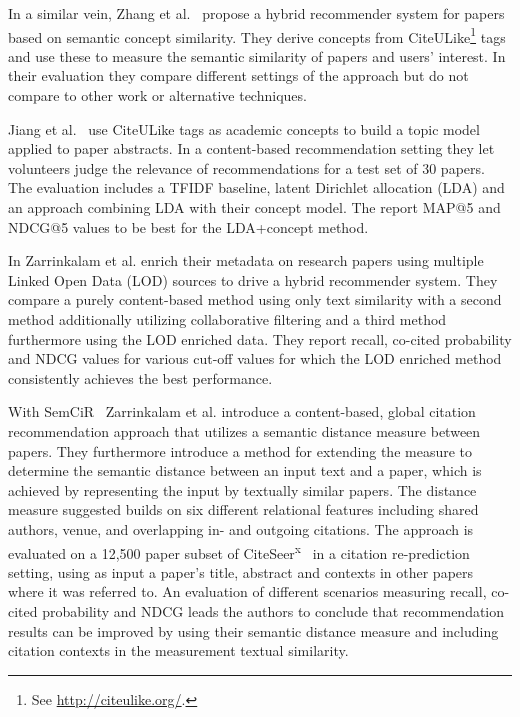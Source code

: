 In a similar vein, Zhang et al.~\cite{Zhang2008} propose a hybrid recommender system for papers based on semantic concept similarity. They derive concepts from CiteULike\footnote{See \url{http://citeulike.org/}.} tags and use these to measure the semantic similarity of papers and users' interest. In their evaluation they compare different settings of the approach but do not compare to other work or alternative techniques.

Jiang et al.~\cite{Jiang2012} use CiteULike tags as academic concepts to build a topic model applied to paper abstracts. In a content-based recommendation setting they let volunteers judge the relevance of recommendations for a test set of 30 papers. The evaluation includes a TFIDF baseline, latent Dirichlet allocation (LDA) and an approach combining LDA with their concept model. The report MAP@5 and NDCG@5 values to be best for the LDA+concept method.

In \cite{Zarrinkalam2012} Zarrinkalam et al. enrich their metadata on research papers using multiple Linked Open Data (LOD) sources to drive a hybrid recommender system. They compare a purely content-based method using only text similarity with a second method additionally utilizing collaborative filtering and a third method furthermore using the LOD enriched data. They report recall, co-cited probability and NDCG values for various cut-off values for which the LOD enriched method consistently achieves the best performance.

With SemCiR~\cite{Zarrinkalam2013} Zarrinkalam et al. introduce a content-based, global citation recommendation approach that utilizes a semantic distance measure between papers. They furthermore introduce a method for extending the measure to determine the semantic distance between an input text and a paper, which is achieved by representing the input by textually similar papers. The distance measure suggested builds on six different relational features including shared authors, venue, and overlapping in- and outgoing citations. The approach is evaluated on a 12,500 paper subset of CiteSeer\textsuperscript{x}~\cite{Caragea2014} in a citation re-prediction setting, using as input a paper's title, abstract and contexts in other papers where it was referred to. An evaluation of different scenarios measuring recall, co-cited probability and NDCG leads the authors to conclude that recommendation results can be improved by using their semantic distance measure and including citation contexts in the measurement textual similarity.

